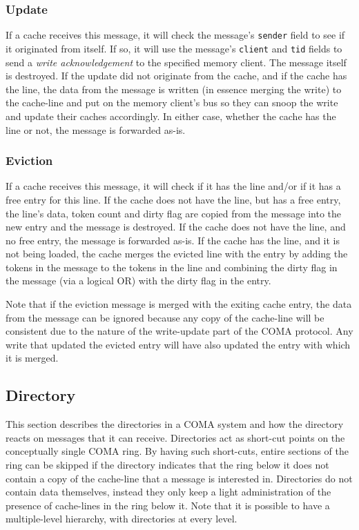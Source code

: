 \subsubsection{Update}
If a cache receives this message, it will check the message's {\tt sender} field to see if it originated from itself. If so, it will use the message's {\tt client} and {\tt tid} fields to send a \emph{write acknowledgement} to the specified memory client. The message itself is destroyed. If the update did not originate from the cache, and if the cache has the line, the data from the message is written (in essence merging the write) to the cache-line and put on the memory client's bus so they can snoop the write and update their caches accordingly. In either case, whether the cache has the line or not, the message is forwarded as-is.

\subsubsection{\label{sec:coma-cache-eviction}Eviction}
If a cache receives this message, it will check if it has the line and/or if it has a free entry for this line. If the cache does not have the line, but has a free entry, the line's data, token count and dirty flag are copied from the message into the new entry and the message is destroyed. If the cache does not have the line, and no free entry, the message is forwarded as-is. If the cache has the line, and it is not being loaded, the cache merges the evicted line with the entry by adding the tokens in the message to the tokens in the line and combining the dirty flag in the message (via a logical OR) with the dirty flag in the entry.

Note that if the eviction message is merged with the exiting cache entry, the data from the message can be ignored because any copy of the cache-line will be consistent due to the nature of the write-update part of the COMA protocol. Any write that updated the evicted entry will have also updated the entry with which it is merged.



\subsection{Directory}
This section describes the directories in a COMA system and how the directory reacts on messages that it can receive. Directories act as short-cut points on the conceptually single COMA ring. By having such short-cuts, entire sections of the ring can be skipped if the directory indicates that the ring below it does not contain a copy of the cache-line that a message is interested in. Directories do not contain data themselves, instead they only keep a light administration of the presence of cache-lines in the ring below it. Note that it is possible to have a multiple-level hierarchy, with directories at every level.

